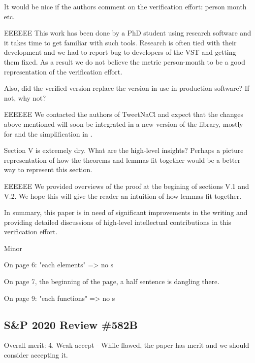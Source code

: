 It would be nice if the authors comment on the verification
effort: person month etc.

\begin{answer}{EEEEEE}
This work has been done by a PhD student using research
software and it takes time to get familiar with such tools.
Research is often tied with their development and we had to
report bug to developers of the VST and getting them fixed.
As a result we do not believe the metric person-month to be
a good representation of the verification effort.
\end{answer}

Also, did the verified version replace the version in use in
production software? If not, why not?

\begin{answer}{EEEEEE}
We contacted the authors of TweetNaCl and expect that
the changes above mentioned will soon be integrated in a
new version of the library, mostly for  and the
simplification in .
\end{answer}

Section V is extremely dry. What are the high-level insights?
Perhaps a picture representation of how the theorems
and lemmas fit together would be a better way to represent
this section.

\begin{answer}{EEEEEE}
We provided overviews of the proof at the begining of sections
V.1 and V.2. We hope this will give the reader an intuition
of how lemmas fit together.
\end{answer}

In summary, this paper is in need of significant improvements
in the writing and providing detailed discussions of
high-level intellectual contributions in this verification effort.

{\color{gray}
Minor

On page 6: "each elements" => no s

On page 7, the beginning of the page, a half sentence is
dangling there.

On page 9: "each functions" => no s}


\subsection{S\&P 2020 Review \#582B}

Overall merit: 4. Weak accept - While flawed, the paper has
merit and we should consider accepting it.


